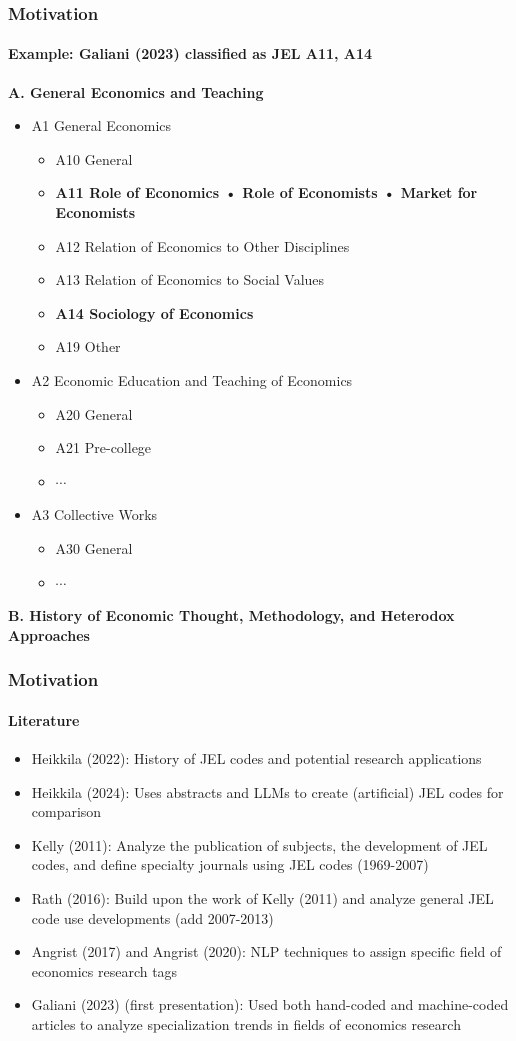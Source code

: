 \documentclass[aspectratio=1610]{beamer}
\begin{document}
\begin{frame}
	\frametitle{Motivation}
	\framesubtitle{Example: Galiani (2023) classified as JEL A11, A14}
	\textbf{A. General Economics and Teaching}
    \begin{itemize}
        \item A1 General Economics
        \begin{itemize}
            \item A10 General
            \item \textbf{A11 Role of Economics • Role of Economists • Market for Economists}
            \item A12 Relation of Economics to Other Disciplines
            \item A13 Relation of Economics to Social Values
            \item \textbf{A14 Sociology of Economics}
            \item A19 Other
        \end{itemize}
        \item A2 Economic Education and Teaching of Economics
        \begin{itemize}
            \item A20 General
            \item A21 Pre-college
            \item $\cdots$
        \end{itemize}
        \item A3 Collective Works
        \begin{itemize}
            \item A30 General
            \item $\cdots$
        \end{itemize}
    \end{itemize}
	\textbf{B. History of Economic Thought, Methodology, and Heterodox Approaches}	
\end{frame}

\begin{frame}
	\frametitle{Motivation}
	\framesubtitle{Literature}
	\begin{itemize}
		\item Heikkila (2022): History of JEL codes and potential research applications
		\item Heikkila (2024): Uses abstracts and LLMs to create (artificial) JEL codes for comparison
		\item Kelly (2011): Analyze the publication of subjects, the development of JEL codes, and define specialty journals using JEL codes (1969-2007)
		\item Rath (2016): Build upon the work of Kelly (2011) and analyze general JEL code use developments (add 2007-2013)
		\item Angrist (2017) and Angrist (2020): NLP techniques to assign specific field of economics research tags
		\item Galiani (2023) (first presentation): Used both hand-coded and machine-coded articles to analyze specialization trends in fields of economics research
	\end{itemize}
\end{frame}
\end{document}
